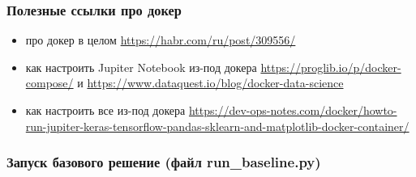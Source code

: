 \subsubsection*{Полезные ссылки про докер }

\begin{itemize}
    \item про докер в целом \url{https://habr.com/ru/post/309556/} 
    \item как настроить Jupiter Notebook из-под докера \url{https://proglib.io/p/docker-compose/} и \url{https://www.dataquest.io/blog/docker-data-science}
    \item как настроить все из-под докера \url{https://dev-ops-notes.com/docker/howto-run-jupiter-keras-tensorflow-pandas-sklearn-and-matplotlib-docker-container/}        
\end{itemize}

\subsubsection*{Запуск базового решение (файл run\_baseline.py)}


